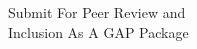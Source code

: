 \documentclass[preview]{standalone}
\begin{document}
\begin{center}
Submit For Peer Review and \\ Inclusion As A GAP Package
\end{center}
\end{document}
